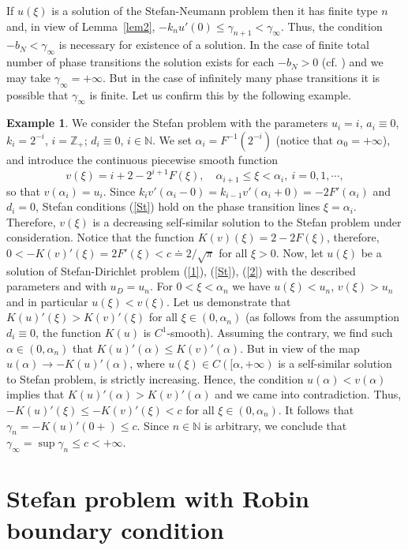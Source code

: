 \documentclass[12pt]{article}
\theoremstyle{plain}
\theoremstyle{definition}
\newtheorem{example}{Example}[section]
\numberwithin{equation}{section}
\newcommand{\N}{{\mathbb N}}
\newcommand{\Z}{{\mathbb Z}}
\begin{document}
If $u(\xi)$ is a solution of the Stefan-Neumann problem then it has finite type $n$ and, in view of Lemma~\ref{lem2}, $-k_nu'(0)\le\gamma_{n+1}<\gamma_\infty$. Thus, the condition $-b_N<\gamma_\infty$ is necessary for existence of a solution. In the case of finite total number of phase transitions the solution exists for each $-b_N>0$ (cf. \cite{Pan4}) and we may take $\gamma_\infty=+\infty$. But in the case of infinitely many phase transitions it is possible that
$\gamma_\infty$ is finite. Let us confirm this by the following example.

\begin{example}
We consider the Stefan problem with the parameters
$u_i=i$, $a_i\equiv 0$, $k_i=2^{-i}$, $i=\Z_+$; $d_i\equiv 0$, $i\in\N$. We set $\alpha_i=F^{-1}(2^{-i})$ (notice that $\alpha_0=+\infty$), and introduce the continuous piecewise smooth function
\[
v(\xi)=i+2-2^{i+1} F(\xi), \quad \alpha_{i+1}\le \xi<\alpha_i, \ i=0,1,\cdots,
\]
so that $v(\alpha_i)=u_i$.
Since $k_iv'(\alpha_i-0)=k_{i-1}v'(\alpha_i+0)=-2F'(\alpha_i)$ and $d_i=0$, Stefan conditions (\ref{St}) hold on the phase transition lines $\xi=\alpha_i$. Therefore, $v(\xi)$ is a decreasing self-similar solution to the Stefan problem under consideration. Notice that the function $K(v)(\xi)=2-2F(\xi)$, therefore, $0<-K(v)'(\xi)=2F'(\xi)<c\doteq 2/\sqrt{\pi}$ for all $\xi>0$. Now, let $u(\xi)$ be a solution of
Stefan-Dirichlet problem (\ref{1}), (\ref{St}), (\ref{2}) with the described parameters and with $u_D=u_n$. For $0<\xi<\alpha_n$ we have $u(\xi)<u_n$, $v(\xi)>u_n$ and in particular $u(\xi)<v(\xi)$. Let us demonstrate that $K(u)'(\xi)>K(v)'(\xi)$ for all $\xi\in (0,\alpha_n)$ (as follows from the assumption $d_i\equiv 0$, the function $K(u)$ is $C^1$-smooth). Assuming the contrary, we find such $\alpha\in (0,\alpha_n)$ that $K(u)'(\alpha)\le K(v)'(\alpha)$. But in view of \cite[Lemma 2]{Pan4}
the map $u(\alpha)\to -K(u)'(\alpha)$, where $u(\xi)\in C([\alpha,+\infty)$ is a self-similar solution to Stefan problem, is strictly increasing. Hence, the condition $u(\alpha)<v(\alpha)$ implies that $K(u)'(\alpha)>K(v)'(\alpha)$ and we came into contradiction. Thus, $-K(u)'(\xi)\le -K(v)'(\xi)<c$ for all $\xi\in (0,\alpha_n)$. It follows that $\gamma_n=-K(u)'(0+)\le c$.
Since $n\in\N$ is arbitrary, we conclude that $\gamma_\infty=\sup\gamma_n \le c<+\infty$.

\end{example}


\section{Stefan problem with Robin boundary condition}\label{sec3}
\end{document}
